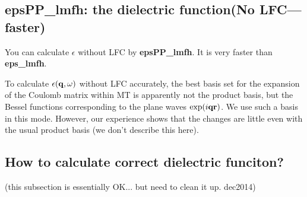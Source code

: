 \documentclass[a4paper,10pt,epsf,fleqn]{article}
\newcommand{\exe}[1]{{\bf #1}}
\begin{document}
\subsection{epsPP\_lmfh: the dielectric function(No LFC--- faster)}

You can calculate $\epsilon$ without LFC by
{\bf epsPP\_lmfh}. It is very faster than \exe{eps\_lmfh}.

To calculate $\epsilon({\bf q},\omega)$ without LFC accurately,
the best basis set for the expansion of the Coulomb matrix within MT
is apparently not the product basis, but the Bessel functions
corresponding to the plane waves $\exp(i{\bf q r})$.
We use such a basis in this mode. 
However, our experience shows that the changes are little even 
with the usual product basis (we don't describe this here).
%



\subsection{How to calculate correct dielectric funciton?}

(this subsection is essentially OK... but need to clean it up. dec2014)
\end{document}
